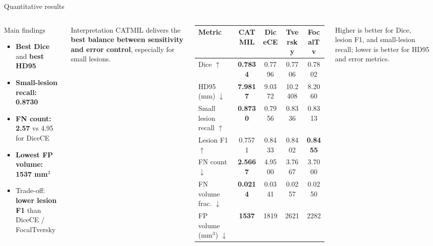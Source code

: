 \documentclass[10pt,aspectratio=169]{beamer}
\newcommand{\best}[1]{\textbf{\color{navy}#1}}
\newcommand{\improve}[1]{\textbf{\color{greenhi}#1}}
\newcommand{\tradeoff}[1]{\textbf{\color{orangehi}#1}}
\begin{document}
\begin{frame}{Quantitative results}
\begin{columns}[T,totalwidth=\textwidth]
\begin{block}{Main findings}
\small
\begin{itemize}
  \item \best{Best Dice} and \best{best HD95}
  \item \improve{Small-lesion recall: 0.8730}
  \item \improve{FN count: 2.57} vs 4.95 for DiceCE
  \item \improve{Lowest FP volume: 1537 mm$^3$}
  \item Trade-off: \tradeoff{lower lesion F1} than DiceCE / FocalTversky
\end{itemize}
\end{block}

\vspace{0.15cm}
\begin{block}{Interpretation}
\small
CATMIL delivers the \textbf{best balance between sensitivity and error control}, especially for small lesions.
\end{block}

\scriptsize
\centering
\begin{tabular}{>{\raggedright\arraybackslash}p{2.6cm}cccc}
\toprule
\textbf{Metric} & \textbf{CATMIL} & \textbf{DiceCE} & \textbf{Tversky} & \textbf{FocalTv} \\
\midrule
Dice $\uparrow$ & \best{0.7834} & 0.7796 & 0.7706 & 0.7802 \\
HD95 (mm) $\downarrow$ & \best{7.9817} & 9.0372 & 10.2408 & 8.2060 \\
Small lesion recall $\uparrow$ & \best{0.8730} & 0.7956 & 0.8336 & 0.8313 \\
Lesion F1 $\uparrow$ & 0.7571 & 0.8433 & 0.8402 & \best{0.8455} \\
FN count $\downarrow$ & \best{2.5667} & 4.9500 & 3.7667 & 3.7000 \\
FN volume frac. $\downarrow$ & \best{0.0214} & 0.0341 & 0.0257 & 0.0250 \\
FP volume (mm$^3$) $\downarrow$ & \best{1537} & 1819 & 2621 & 2282 \\
\bottomrule
\end{tabular}
\vspace{0.15cm}

{\tiny Higher is better for Dice, lesion F1, and small-lesion recall; lower is better for HD95 and error metrics.}
\end{columns}
\end{frame}
\end{document}
